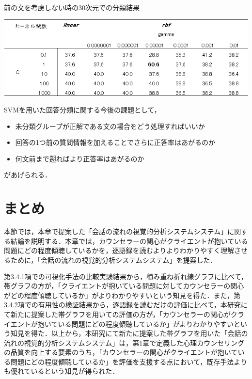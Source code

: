 \documentclass[shuuron]{kuee}
\begin{document}
\begin{table}
  \caption{前の文を考慮しない時の30次元での分類結果}
  \label{table:hayashida4}
  \begin{center}
    \includegraphics[width=\linewidth]{hayashida4.png}
  \end{center}
\end{table}

SVMを用いた回答分類に関する今後の課題として，
\begin{itemize}
  \item 未分類グループが正解である文の場合をどう処理すればいいか
  \item 回答の1つ前の質問情報を加えることでさらに正答率はあがるのか
  \item   何文前まで遡ればより正答率はあがるのか
\end{itemize}
があげられる．


\section{まとめ}

本節では，本章で提案した「会話の流れの視覚的分析システムシステム」に関する結論を説明する．本章では，カウンセラーの関心がクライエントが抱いている問題にどの程度傾聴しているかを，逐語録を読むよりよりわかりやすく理解させるために，「会話の流れの視覚的分析システムシステム」を提案した．


第3.4.1項での可視化手法の比較実験結果から，積み重ね折れ線グラフに比べて，帯グラフの方が，「クライエントが抱いている問題に対してカウンセラーの関心がどの程度傾聴しているか」がよりわかりやすいという知見を得た．また，第3.4.2項での有用性の検証結果から，逐語録を読むだけの評価に比べて，本研究にて新たに提案した帯グラフを用いての評価の方が，「カウンセラーの関心がクライエントが抱いている問題にどの程度傾聴しているか」がよりわかりやすいという知見を得た．以上から，本研究にて新たに提案した帯グラフを用いた「会話の流れの視覚的分析システムシステム」は，第1章で定義した心理カウンセリングの品質を向上する要素のうち，「カウンセラーの関心がクライエントが抱いている問題にどの程度傾聴しているか」を評価を支援する点において，既存手法よりも優れているという知見が得られた．
\end{document}
